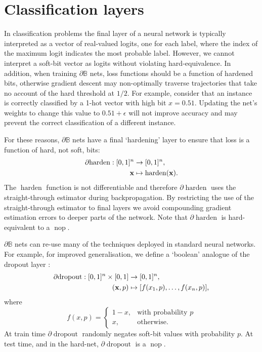 \documentclass{article}
\theoremstyle{plain}
\theoremstyle{definition}
\theoremstyle{remark}
\begin{document}
\section{Classification layers}\label{sec:classification}

In classification problems the final layer of a neural network is typically interpreted as a vector of real-valued logits, one for each label, where the index of the maximum logit indicates the most probable label. However, we cannot interpret a soft-bit vector as logits without violating hard-equivalence. In addition, when training $\partial\mathbb{B}$ nets, loss functions should be a function of hardened bits, otherwise gradient descent may non-optimally traverse trajectories that take no account of the hard threshold at $1/2$. For example, consider that an instance is correctly classified by a 1-hot vector with high bit $x=0.51$. Updating the net's weights to change this value to $0.51+\epsilon$ will not improve accuracy and may prevent the correct classification of a different instance. 

For these reasons, $\partial\mathbb{B}$ nets have a final `hardening' layer to ensure that loss is a function of hard, not soft, bits:
\begin{equation*}
\begin{aligned}
\partial\!\operatorname{harden}: [0,1]^{n} &\to [0,1]^{n}, \\
{\bf x} &\mapsto \operatorname{harden}({\bf x})\text{.}
\end{aligned}
\end{equation*}
The $\operatorname{harden}$ function is not differentiable and therefore $\partial\!\operatorname{harden}$ uses the straight-through estimator \cite{DBLP:journals/corr/BengioLC13} during backpropagation. By restricting the use of the straight-through estimator to final layers we avoid compounding gradient estimation errors to deeper parts of the network. Note that $\partial\!\operatorname{harden}$ is hard-equivalent to a $\operatorname{nop}$.

$\partial\mathbb{B}$ nets can re-use many of the techniques deployed in standard neural networks. For example, for improved generalisation, we define a `boolean' analogue of the dropout layer \cite{JMLR:v15:srivastava14a}:
\begin{equation*}
\begin{aligned}
\partial\!\operatorname{dropout}: [0,1]^{n} \times [0,1] &\to [0,1]^{n}, \\
({\bf x}, p) &\mapsto [f(x_{1}, p), \dots, f(x_{n}, p)]\text{,}
\end{aligned}
\end{equation*}
where
\begin{equation*}
f(x, p) = \begin{cases}
1 - x, & \text{with probability } p \\
x, & \text{otherwise.}
\end{cases}
\end{equation*}
At train time $\partial\!\operatorname{dropout}$ randomly negates soft-bit values with probability $p$. At test time, and in the hard-net, $\partial\!\operatorname{dropout}$ is a $\operatorname{nop}$.
\end{document}
